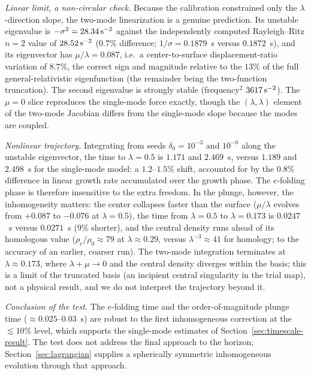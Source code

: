 \documentclass[11pt]{article}
\begin{document}
\emph{Linear limit, a non-circular check.} Because the calibration constrained only the $\lambda$-direction slope, the two-mode linearization is a genuine prediction. Its unstable eigenvalue is $-\sigma^2=28.34\,{\rm s}^{-2}$ against the independently computed Rayleigh--Ritz $n=2$ value of $28.52\,{\rm s}^{-2}$ ($0.7\%$ difference; $1/\sigma=0.1879$~s versus $0.1872$~s), and its eigenvector has $\mu/\lambda=0.087$, i.e.\ a center-to-surface displacement-ratio variation of $8.7\%$, the correct sign and magnitude relative to the $13\%$ of the full general-relativistic eigenfunction (the remainder being the two-function truncation). The second eigenvalue is strongly stable (frequency$^2$ $3617\,{\rm s}^{-2}$). The $\mu=0$ slice reproduces the single-mode force exactly, though the $(\lambda,\lambda)$ element of the two-mode Jacobian differs from the single-mode slope because the modes are coupled.

\emph{Nonlinear trajectory.} Integrating from seeds $\delta_0=10^{-3}$ and $10^{-6}$ along the unstable eigenvector, the time to $\lambda=0.5$ is $1.171$ and $2.469$~s, versus $1.189$ and $2.498$~s for the single-mode model: a $1.2$--$1.5\%$ shift, accounted for by the $0.8\%$ difference in linear growth rate accumulated over the growth phase. The $e$-folding phase is therefore insensitive to the extra freedom. In the plunge, however, the inhomogeneity matters: the center collapses faster than the surface ($\mu/\lambda$ evolves from $+0.087$ to $-0.076$ at $\lambda=0.5$), the time from $\lambda=0.5$ to $\lambda=0.173$ is $0.0247$~s versus $0.0271$~s ($9\%$ shorter), and the central density runs ahead of its homologous value ($\rho_c/\rho_0\approx79$ at $\lambda\approx0.29$, versus $\lambda^{-3}\approx41$ for homology; to the accuracy of an earlier, coarser run). The two-mode integration terminates at $\lambda\approx0.173$, where $\lambda+\mu\to0$ and the central density diverges within the basis; this is a limit of the truncated basis (an incipient central singularity in the trial map), not a physical result, and we do not interpret the trajectory beyond it.

\emph{Conclusion of the test.} The $e$-folding time and the order-of-magnitude plunge time ($\approx0.025$--$0.03$~s) are robust to the first inhomogeneous correction at the $\lesssim10\%$ level, which supports the single-mode estimates of Section~\ref{sec:timescale-result}. The test does not address the final approach to the horizon; Section~\ref{sec:lagrangian} supplies a spherically symmetric inhomogeneous evolution through that approach.
\end{document}

